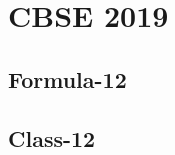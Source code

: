 \documentclass[journal]{IEEEtran}
\begin{document}
\newpage


\tableofcontents

\newpage
\onecolumn


\renewcommand{\thetable}{\theenumi}

\section{CBSE 2019}
\subsection{Formula-12}

\subsection{Class-12}

\end{document}
